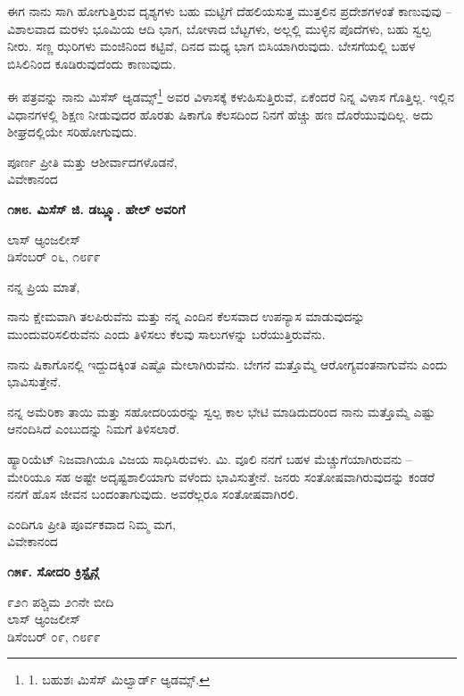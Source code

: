 ಈಗ ನಾನು ಸಾಗಿ ಹೋಗುತ್ತಿರುವ ದೃಶ್ಯಗಳು ಬಹು ಮಟ್ಟಿಗೆ ದೆಹಲಿಯಸುತ್ತ ಮುತ್ತಲಿನ ಪ್ರದೇಶಗಳಂತೆ ಕಾಣುವುವು – ವಿಶಾಲವಾದ ಮರಳು ಭೂಮಿಯ ಆದಿ ಭಾಗ, ಬೋಳಾದ ಬೆಟ್ಟಗಳು, ಅಲ್ಲಲ್ಲಿ ಮುಳ್ಳಿನ ಪೊದೆಗಳು, ಬಹು ಸ್ವಲ್ಪ ನೀರು. ಸಣ್ಣ ಝರಿಗಳು ಮಂಜಿನಿಂದ ಕಟ್ಟಿವೆ, ದಿನದ ಮಧ್ಯ ಭಾಗ ಬಿಸಿಯಾಗಿರುವುದು. ಬೇಸಗೆಯಲ್ಲಿ ಬಹಳ ಬಿಸಿಲಿನಿಂದ ಕೂಡಿರುವುದೆಂದು ಕಾಣುವುದು.

ಈ ಪತ್ರವನ್ನು ನಾನು ಮಿಸೆಸ್ ಆ್ಯಡಮ್ಸ್\footnote{1. ಬಹುಶಃ ಮಿಸೆಸ್ ಮಿಲ್ವಾರ್ಡ್ ಆ್ಯಡಮ್ಸ್.} ಅವರ ವಿಳಾಸಕ್ಕೆ ಕಳುಹಿಸುತ್ತಿರುವೆ, ಏಕೆಂದರೆ ನಿನ್ನ ವಿಳಾಸ ಗೊತ್ತಿಲ್ಲ. ಇಲ್ಲಿನ ವಿಧಾನಗಳಲ್ಲಿ ಶಿಕ್ಷಣ ನೀಡುವುದರ ಹೊರತು ಷಿಕಾಗೊ ಕೆಲಸದಿಂದ ನಿನಗೆ ಹೆಚ್ಚು ಹಣ ದೊರೆಯುವುದಿಲ್ಲ. ಅದು ಶೀಘ್ರದಲ್ಲಿಯೇ ಸರಿಹೋಗುವುದು.

\begin{flushright}
ಪೂರ್ಣ ಪ್ರೀತಿ ಮತ್ತು ಆಶೀರ್ವಾದಗಳೊಡನೆ,\\ವಿವೇಕಾನಂದ
\end{flushright}

\begin{center}
\textbf{೧೫೮. ಮಿಸೆಸ್ ಜಿ. ಡಬ್ಲ್ಯೂ. ಹೇಲ್ ಅವರಿಗೆ}
\end{center}

\begin{flushright}
ಲಾಸ್ ಆ್ಯಂಜಲೀಸ್\\ಡಿಸೆಂಬರ್ ೦೬, ೧೮೯೯
\end{flushright}

ನನ್ನ ಪ್ರಿಯ ಮಾತೆ,

ನಾನು ಕ್ಷೇಮವಾಗಿ ತಲಪಿರುವೆನು ಮತ್ತು ನನ್ನ ಎಂದಿನ ಕೆಲಸವಾದ ಉಪನ್ಯಾಸ ಮಾಡುವುದನ್ನು ಮುಂದುವರಿಸಲಿರುವೆನು ಎಂದು ತಿಳಿಸಲು ಕೆಲವು ಸಾಲುಗಳನ್ನು ಬರೆಯುತ್ತಿರುವೆನು.

ನಾನು ಷಿಕಾಗೊನಲ್ಲಿ ಇದ್ದುದಕ್ಕಿಂತ ಎಷ್ಟೊ ಮೇಲಾಗಿರುವೆನು. ಬೇಗನೆ ಮತ್ತೊಮ್ಮೆ ಆರೋಗ್ಯವಂತನಾಗುವೆನು ಎಂದು ಭಾವಿಸುತ್ತೇನೆ.

ನನ್ನ ಅಮೆರಿಕಾ ತಾಯಿ ಮತ್ತು ಸಹೋದರಿಯರನ್ನು ಸ್ವಲ್ಪ ಕಾಲ ಭೇಟಿ ಮಾಡಿದುದರಿಂದ ನಾನು ಮತ್ತೊಮ್ಮೆ ಎಷ್ಟು ಆನಂದಿಸಿದೆ ಎಂಬುದನ್ನು ನಿಮಗೆ ತಿಳಿಸಲಾರೆ.

ಹ್ಯಾರಿಯೆಟ್ ನಿಜವಾಗಿಯೂ ವಿಜಯ ಸಾಧಿಸಿರುವಳು. ಮಿ. ವೂಲಿ ನನಗೆ ಬಹಳ ಮೆಚ್ಚುಗೆಯಾಗಿರುವನು – ಮೇರಿಯೂ ಸಹ ಅಷ್ಟೇ ಅದೃಷ್ಟಶಾಲಿಯಾಗು ವಳೆಂದು ಭಾವಿಸುತ್ತೇನೆ. ಜನರು ಸಂತೋಷವಾಗಿರುವುದನ್ನು ಕಂಡರೆ ನನಗೆ ಹೊಸ ಜೀವನ ಬಂದಂತಾಗುವುದು. ಅವರೆಲ್ಲರೂ ಸಂತೋಷವಾಗಿರಲಿ.

\begin{flushright}
ಎಂದಿಗೂ ಪ್ರೀತಿ ಪೂರ್ವಕವಾದ ನಿಮ್ಮ ಮಗ,\\ವಿವೇಕಾನಂದ
\end{flushright}

\begin{center}
\textbf{೧೫೯. ಸೋದರಿ ಕ್ರಿಸ್ಟೈನ್ಗೆ}
\end{center}

\begin{flushright}
೯೨೧ ಪಶ್ಚಿಮ ೨೧ನೇ ಬೀದಿ\\ಲಾಸ್ ಆ್ಯಂಜಲೀಸ್\\ಡಿಸೆಂಬರ್ ೦೯, ೧೮೯೯
\end{flushright}

